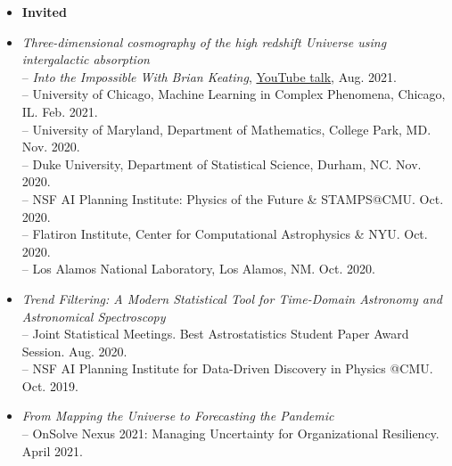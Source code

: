 \documentclass[letterpaper,10pt]{article}
\begin{document}
\begin{itemize}
\item[] \hspace{-4ex} {\bf Invited} 
\item {\it Three-dimensional cosmography of the high redshift Universe using intergalactic absorption}\\
\hspace{0.9em}-- {\it Into the Impossible With Brian Keating}, \href{https://www.youtube.com/watch?v=jpD_4S7Wi3E&t=2123s}{YouTube talk}, Aug. 2021. \\
\hspace{0.9em}-- University of Chicago, Machine Learning in Complex Phenomena, Chicago, IL. Feb. 2021.\\
\hspace{0.9em}-- University of Maryland, Department of Mathematics, College Park, MD. Nov. 2020.\\
\hspace{0.9em}-- Duke University, Department of Statistical Science, Durham, NC. Nov. 2020.\\
\hspace{0.9em}-- NSF AI Planning Institute: Physics of the Future \& STAMPS@CMU. Oct. 2020.\\
\hspace{0.9em}-- Flatiron Institute, Center for Computational Astrophysics \& NYU. Oct. 2020.\\
\hspace{0.9em}-- Los Alamos National Laboratory, Los Alamos, NM. Oct. 2020. 

\vspace{0.1cm}

\item {\it Trend Filtering: A Modern Statistical Tool for Time-Domain Astronomy and Astronomical Spectroscopy}\\
\hspace{0.9em}-- Joint Statistical Meetings. Best Astrostatistics Student Paper Award Session. Aug. 2020.\\
\hspace{0.9em}-- NSF AI Planning Institute for Data-Driven Discovery in Physics @CMU. Oct. 2019.

\vspace{0.1cm}

\item {\it From Mapping the Universe to Forecasting the Pandemic}\\
\hspace{0.9em}-- OnSolve Nexus 2021: {Managing Uncertainty for Organizational Resiliency}. April 2021.


\end{itemize}
\end{document}
